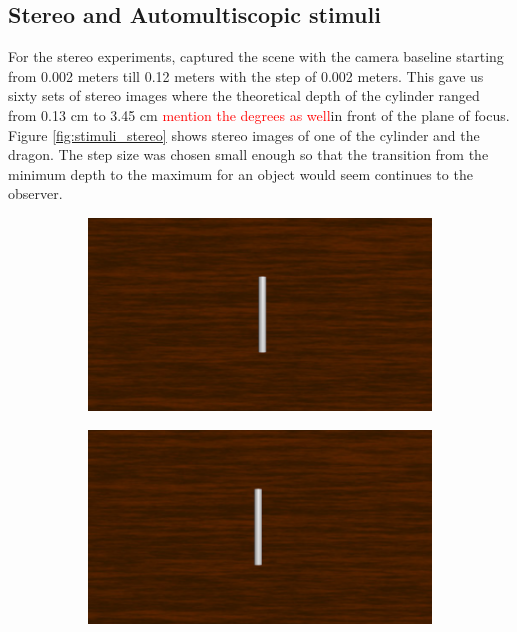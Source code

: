 \subsection{Stereo and Automultiscopic stimuli}
For the stereo experiments, captured the scene with the camera baseline starting from 0.002 meters till 0.12 meters with the step of 0.002 meters. This gave us sixty sets of stereo images where the theoretical depth of the cylinder ranged from 0.13 cm to 3.45 cm \textcolor{red}{mention the degrees as well}in front of the plane of focus. Figure \ref{fig:stimuli_stereo} shows stereo images of one of the cylinder and the dragon. The step size was chosen small enough so that the transition from the minimum depth to the maximum for an object would seem continues to the observer.
\begin{figure}[htbp]
    \begin{subfigure}[b]{0.5\textwidth}
        \includegraphics[width=\textwidth]{./Template_Figures/57L.png}
        \caption{}\label{fig:left_stereo_cyl}
    \end{subfigure}
    \begin{subfigure}[b]{0.5\textwidth}
        \includegraphics[width=\textwidth]{./Template_Figures/57R}
        \caption{}\label{fig:right_stereo_cyl}
    \end{subfigure}


\end{figure}

